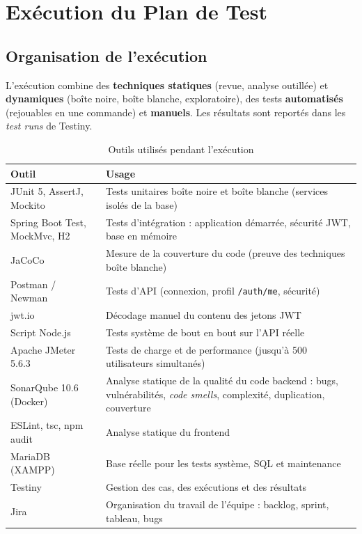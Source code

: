 \documentclass[12pt,a4paper]{report}
\begin{document}
\chapter{Exécution du Plan de Test}\label{ch:execution}

\section{Organisation de l'exécution}
L'exécution combine des \textbf{techniques statiques} (revue, analyse outillée) et \textbf{dynamiques} (boîte noire, boîte blanche, exploratoire), des tests \textbf{automatisés} (rejouables en une commande) et \textbf{manuels}. Les résultats sont reportés dans les \textit{test runs} de Testiny.

\begin{table}[H]
\centering
\caption{Outils utilisés pendant l'exécution}
\small
\begin{tabularx}{\textwidth}{@{}p{4.2cm}X@{}}
\toprule
\rowcolor{evlight}\textbf{Outil} & \textbf{Usage}\\
\midrule
JUnit 5, AssertJ, Mockito & Tests unitaires boîte noire et boîte blanche (services isolés de la base)\\
Spring Boot Test, MockMvc, H2 & Tests d'intégration : application démarrée, sécurité JWT, base en mémoire\\
JaCoCo & Mesure de la couverture du code (preuve des techniques boîte blanche)\\
Postman / Newman & Tests d'API (connexion, profil \texttt{/auth/me}, sécurité)\\
jwt.io & Décodage manuel du contenu des jetons JWT\\
Script Node.js & Tests système de bout en bout sur l'API réelle\\
Apache JMeter 5.6.3 & Tests de charge et de performance (jusqu'à 500 utilisateurs simultanés)\\
SonarQube 10.6 (Docker) & Analyse statique de la qualité du code backend : bugs, vulnérabilités, \textit{code smells}, complexité, duplication, couverture\\
ESLint, tsc, npm audit & Analyse statique du frontend\\
MariaDB (XAMPP) & Base réelle pour les tests système, SQL et maintenance\\
Testiny & Gestion des cas, des exécutions et des résultats\\
Jira & Organisation du travail de l'équipe : backlog, sprint, tableau, bugs\\
\bottomrule
\end{tabularx}
\end{table}
\end{document}
